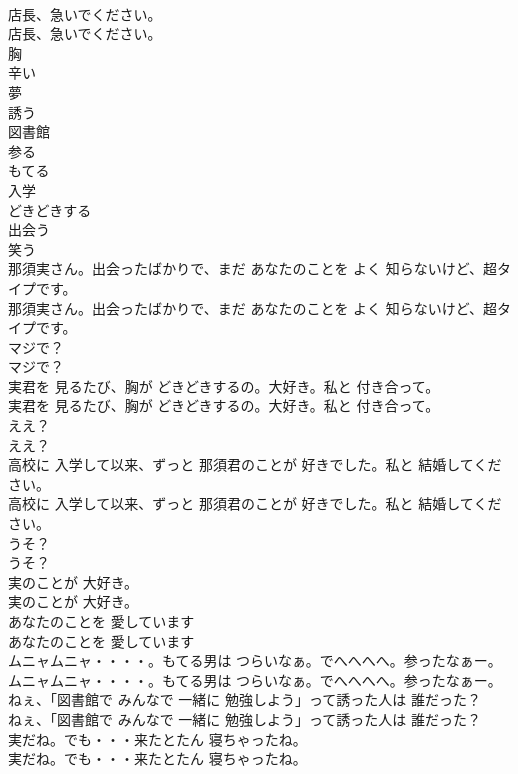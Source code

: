 \documentclass[8pt]{extreport}
\begin{document}
\begin{CJK}{UTF8}{min}
\\	店長、急いでください。	
\\	店長、急いでください。 
\\	胸
\\	辛い
\\	夢
\\	誘う
\\	図書館
\\	参る
\\	もてる
\\	入学
\\	どきどきする
\\	出会う
\\	笑う
\\	那須実さん。出会ったばかりで、まだ あなたのことを よく 知らないけど、超タイプです。	
\\	那須実さん。出会ったばかりで、まだ あなたのことを よく 知らないけど、超タイプです。 
\\	マジで？	
\\	マジで？ 
\\	実君を 見るたび、胸が どきどきするの。大好き。私と 付き合って。	
\\	実君を 見るたび、胸が どきどきするの。大好き。私と 付き合って。 
\\	ええ？	
\\	ええ？ 
\\	高校に 入学して以来、ずっと 那須君のことが 好きでした。私と 結婚してください。	
\\	高校に 入学して以来、ずっと 那須君のことが 好きでした。私と 結婚してください。 
\\	うそ？	
\\	うそ？ 
\\	実のことが 大好き。	
\\	実のことが 大好き。 
\\	あなたのことを 愛しています	
\\	あなたのことを 愛しています 
\\	ムニャムニャ・・・・。もてる男は つらいなぁ。でへへへへ。参ったなぁー。	
\\	ムニャムニャ・・・・。もてる男は つらいなぁ。でへへへへ。参ったなぁー。 
\\	ねぇ、「図書館で みんなで 一緒に 勉強しよう」って誘った人は 誰だった？	
\\	ねぇ、「図書館で みんなで 一緒に 勉強しよう」って誘った人は 誰だった？ 
\\	実だね。でも・・・来たとたん 寝ちゃったね。	
\\	実だね。でも・・・来たとたん 寝ちゃったね。 

\end{CJK}
\end{document}
